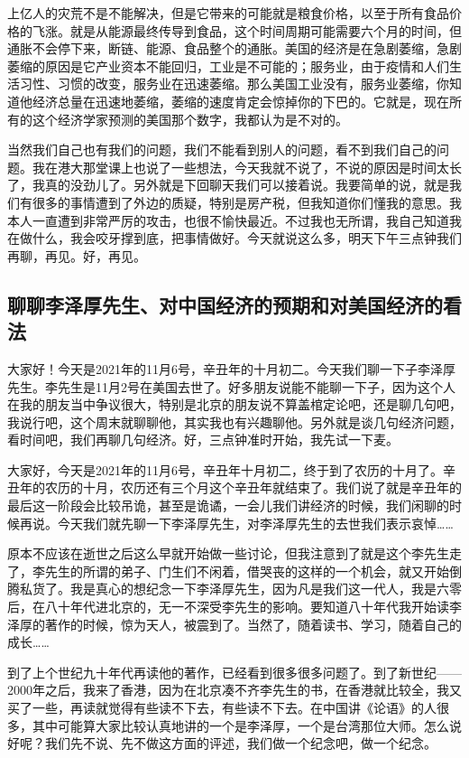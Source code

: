 \documentclass[UTF8, 12pt, a4paper]{ctexrep}
\begin{document}
上亿人的灾荒不是不能解决，但是它带来的可能就是粮食价格，以至于所有食品价格的飞涨。就是从能源最终传导到食品，这个时间周期可能需要六个月的时间，但通胀不会停下来，断链、能源、食品整个的通胀。美国的经济是在急剧萎缩，急剧萎缩的原因是它产业资本不能回归，工业是不可能的；服务业，由于疫情和人们生活习性、习惯的改变，服务业在迅速萎缩。那么美国工业没有，服务业萎缩，你知道他经济总量在迅速地萎缩，萎缩的速度肯定会惊掉你的下巴的。它就是，现在所有的这个经济学家预测的美国那个数字，我都认为是不对的。

当然我们自己也有我们的问题，我们不能看到别人的问题，看不到我们自己的问题。我在港大那堂课上也说了一些想法，今天我就不说了，不说的原因是时间太长了，我真的没劲儿了。另外就是下回聊天我们可以接着说。我要简单的说，就是我们有很多的事情遭到了外边的质疑，特别是房产税，但我知道你们懂我的意思。我本人一直遭到非常严厉的攻击，也很不愉快最近。不过我也无所谓，我自己知道我在做什么，我会咬牙撑到底，把事情做好。今天就说这么多，明天下午三点钟我们再聊，再见。好，再见。

\subsection{聊聊李泽厚先生、对中国经济的预期和对美国经济的看法}

大家好！今天是2021年的11月6号，辛丑年的十月初二。今天我们聊一下子李泽厚先生。李先生是11月2号在美国去世了。好多朋友说能不能聊一下子，因为这个人在我的朋友当中争议很大，特别是北京的朋友说不算盖棺定论吧，还是聊几句吧，我说行吧，这个周末就聊聊他，其实我也有兴趣聊他。另外就是谈几句经济问题，看时间吧，我们再聊几句经济。好，三点钟准时开始，我先试一下麦。

大家好，今天是2021年的11月6号，辛丑年十月初二，终于到了农历的十月了。辛丑年的农历的十月，农历还有三个月这个辛丑年就结束了。我们说了就是辛丑年的最后这一阶段会比较吊诡，甚至是诡谲，一会儿我们讲经济的时候，我们闲聊的时候再说。今天我们就先聊一下李泽厚先生，对李泽厚先生的去世我们表示哀悼……

原本不应该在逝世之后这么早就开始做一些讨论，但我注意到了就是这个李先生走了，李先生的所谓的弟子、门生们不闲着，借哭丧的这样的一个机会，就又开始倒腾私货了。我是真心的想纪念一下李泽厚先生，因为凡是我们这一代人，我是六零后，在八十年代进北京的，无一不深受李先生的影响。要知道八十年代我开始读李泽厚的著作的时候，惊为天人，被震到了。当然了，随着读书、学习，随着自己的成长……

到了上个世纪九十年代再读他的著作，已经看到很多很多问题了。到了新世纪——2000年之后，我来了香港，因为在北京凑不齐李先生的书，在香港就比较全，我又买了一些，再读就觉得有些读不下去，有些读不下去。在中国讲《论语》的人很多，其中可能算大家比较认真地讲的一个是李泽厚，一个是台湾那位大师。怎么说好呢？我们先不说、先不做这方面的评述，我们做一个纪念吧，做一个纪念。
\end{document}

